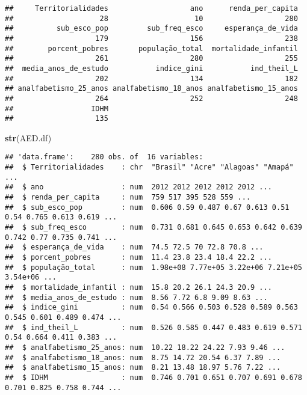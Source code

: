 \documentclass[
]{article}
\newenvironment{Shaded}{\begin{snugshade}}{\end{snugshade}}
\newcommand{\FunctionTok}[1]{\textcolor[rgb]{0.13,0.29,0.53}{\textbf{#1}}}
\newcommand{\NormalTok}[1]{#1}
\begin{document}
\begin{verbatim}
##     Territorialidades                   ano      renda_per_capita 
##                    28                    10                   280 
##          sub_esco_pop         sub_freq_esco     esperança_de_vida 
##                   179                   156                   238 
##        porcent_pobres       população_total  mortalidade_infantil 
##                   261                   280                   255 
##  media_anos_de_estudo           indice_gini           ind_theil_L 
##                   202                   134                   182 
## analfabetismo_25_anos analfabetismo_18_anos analfabetismo_15_anos 
##                   264                   252                   248 
##                  IDHM 
##                   135
\end{verbatim}

\begin{Shaded}
\begin{Highlighting}[]
\FunctionTok{str}\NormalTok{(AED.df)}
\end{Highlighting}
\end{Shaded}

\begin{verbatim}
## 'data.frame':    280 obs. of  16 variables:
##  $ Territorialidades    : chr  "Brasil" "Acre" "Alagoas" "Amapá" ...
##  $ ano                  : num  2012 2012 2012 2012 2012 ...
##  $ renda_per_capita     : num  759 517 395 528 559 ...
##  $ sub_esco_pop         : num  0.606 0.59 0.487 0.67 0.613 0.51 0.54 0.765 0.613 0.619 ...
##  $ sub_freq_esco        : num  0.731 0.681 0.645 0.653 0.642 0.639 0.742 0.77 0.735 0.741 ...
##  $ esperança_de_vida    : num  74.5 72.5 70 72.8 70.8 ...
##  $ porcent_pobres       : num  11.4 23.8 23.4 18.4 22.2 ...
##  $ população_total      : num  1.98e+08 7.77e+05 3.22e+06 7.21e+05 3.54e+06 ...
##  $ mortalidade_infantil : num  15.8 20.2 26.1 24.3 20.9 ...
##  $ media_anos_de_estudo : num  8.56 7.72 6.8 9.09 8.63 ...
##  $ indice_gini          : num  0.54 0.566 0.503 0.528 0.589 0.563 0.545 0.601 0.489 0.474 ...
##  $ ind_theil_L          : num  0.526 0.585 0.447 0.483 0.619 0.571 0.54 0.664 0.411 0.383 ...
##  $ analfabetismo_25_anos: num  10.22 18.22 24.22 7.93 9.46 ...
##  $ analfabetismo_18_anos: num  8.75 14.72 20.54 6.37 7.89 ...
##  $ analfabetismo_15_anos: num  8.21 13.48 18.97 5.76 7.22 ...
##  $ IDHM                 : num  0.746 0.701 0.651 0.707 0.691 0.678 0.701 0.825 0.758 0.744 ...
\end{verbatim}
\end{document}
